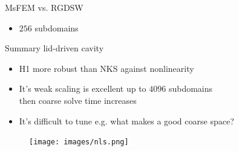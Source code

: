 \begin{frame}{MsFEM vs. RGDSW}
	\begin{itemize}
		\item $256$ subdomains
	\end{itemize}
	\begin{figure}
		\centering
		
		\label{fig:msfem-vs-rgdsw}
	\end{figure}
\end{frame}

\begin{frame}{Summary lid-driven cavity}
	\begin{itemize}
    \item H1 more robust than NKS against nonlinearity
    \item It's weak scaling is excellent up to $4096$ subdomains\\then coarse solve time increases %
		\item It's difficult to tune e.g. what makes a good coarse space?%
	\end{itemize}

	\begin{figure}
		\texttt{[image: images/nls.png]}
	\end{figure}
\end{frame}


